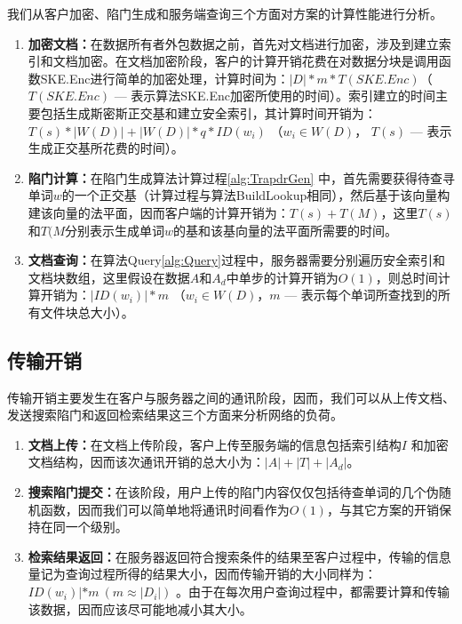 我们从客户加密、陷门生成和服务端查询三个方面对方案的计算性能进行分析。
\begin{enumerate}
  \item \textbf{加密文档：}在数据所有者外包数据之前，首先对文档进行加密，涉及到建立索引和文档加密。在文档加密阶段，客户的计算开销花费在对数据分块是调用函数SKE.Enc进行简单的加密处理，计算时间为：$|D| * m * T(SKE.Enc)$（$T(SKE.Enc)$ --- 表示算法SKE.Enc加密所使用的时间）。索引建立的时间主要包括生成斯密斯正交基和建立安全索引，其计算时间开销为：$T(s) * |W(D)| + |W(D)| * q * ID(w_i)$ （$w_i \in W(D)$， $T(s)$ --- 表示生成正交基所花费的时间）。

  \item \textbf{陷门计算：}在陷门生成算法计算过程\ref{alg:TrapdrGen} 中，首先需要获得待查寻单词$w$的一个正交基（计算过程与算法BuildLookup相同），然后基于该向量构建该向量的法平面，因而客户端的计算开销为：$T(s) + T(M)$，这里$T(s)$和$T(M$分别表示生成单词$w$的基和该基向量的法平面所需要的时间。

  \item \textbf{文档查询：}在算法Query\ref{alg:Query}过程中，服务器需要分别遍历安全索引和文档块数组，这里假设在数据$A$和$A_d$中单步的计算开销为$O(1)$，则总时间计算开销为：$|ID(w_i)| * m$ （$w_i \in W(D)$，$m$ --- 表示每个单词所查找到的所有文件块总大小）。
\end{enumerate}

\subsection{传输开销}
\label{sec:searchpattern_capability_transmission}

传输开销主要发生在客户与服务器之间的通讯阶段，因而，我们可以从上传文档、发送搜索陷门和返回检索结果这三个方面来分析网络的负荷。

\begin{enumerate}
  \item \textbf{文档上传：}在文档上传阶段，客户上传至服务端的信息包括索引结构$I$ 和加密文档结构，因而该次通讯开销的总大小为：$|A| + |T| + |A_d|$。

  \item \textbf{搜索陷门提交：}在该阶段，用户上传的陷门内容仅仅包括待查单词的几个伪随机函数，因而我们可以简单地将通讯时间看作为$O(1)$，与其它方案的开销保持在同一个级别。

  \item \textbf{检索结果返回：}在服务器返回符合搜索条件的结果至客户过程中，传输的信息量记为查询过程所得的结果大小，因而传输开销的大小同样为：$ID(w_i)| * m \ (m \approx |D_i|)$ 。由于在每次用户查询过程中，都需要计算和传输该数据，因而应该尽可能地减小其大小。

\end{enumerate}





